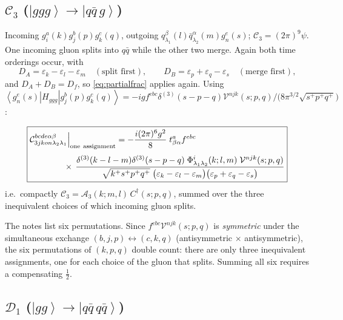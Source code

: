 \documentclass[11pt]{article}
\newcommand{\eps}{\varepsilon}
\newcommand{\dg}{\dagger}
\newcommand{\dthree}{\delta^{(3)}}
\newcommand{\ket}[1]{\left|#1\right\rangle}
\newcommand{\bra}[1]{\left\langle#1\right|}
\newcommand{\Ph}{\Phi}
\newcommand{\Vg}{\mathcal{V}}
\newcommand{\qk}[3]{q^{#1}_{#2}(#3)}
\newcommand{\aqk}[3]{\bar q^{#1}_{#2}(#3)}
\newcommand{\gl}[3]{g^{#1}_{#2}(#3)}
\begin{document}
\subsection{$\mathcal C_3$ ($\ket{ggg}\to\ket{q\bar q\,g}$)}

Incoming $\gl{a}{i}{k}\gl{b}{j}{p}\gl{c}{k}{q}$, outgoing
$\qk{\beta}{\lambda_1}{l}\aqk{\alpha}{\lambda_2}{m}\gl{e}{n}{s}$; $\mathcal C_{3}=(2\pi)^{9}\psi$.
One incoming gluon splits into $q\bar q$ while the other two merge. Again both time orderings
occur, with
\begin{equation}
D_{A}=\eps_{k}-\eps_{l}-\eps_{m}\quad(\text{split first}),\qquad
D_{B}=\eps_{p}+\eps_{q}-\eps_{s}\quad(\text{merge first}),
\end{equation}
and $D_{A}+D_{B}=D_{f}$, so \eqref{eq:partialfrac} applies again. Using
$\bra{\gl{e}{n}{s}}H_{ggg}\ket{\gl{b}{j}{p}\gl{c}{k}{q}}
=-igf^{ebc}\dthree(s-p-q)\Vg^{njk}(s;p,q)/\big(8\pi^{3/2}\sqrt{s^{+}p^{+}q^{+}}\big)$:

\begin{res}
\begin{align}
\boxed{
\begin{aligned}
&\mathcal C^{bcde\alpha\beta}_{3jkon\lambda_2\lambda_1}\Big|_{\rm one\ assignment}
=-\frac{i(2\pi)^{6}g^{2}}{8}\;t^{a}_{\beta\alpha}f^{ebc}
\\[3pt]
&\hspace{1.4cm}\times\,
\frac{\dthree(k-l-m)\dthree(s-p-q)\;\Ph^{i}_{\lambda_1\lambda_2}(k;l,m)\;\Vg^{njk}(s;p,q)}
{\sqrt{k^{+}s^{+}p^{+}q^{+}}\;\big(\eps_{k}-\eps_{l}-\eps_{m}\big)\big(\eps_{p}+\eps_{q}-\eps_{s}\big)}
\end{aligned}}
\label{eq:C3}
\end{align}
i.e.\ compactly $\mathcal C_{3}=\mathcal A_{3}(k;m,l)\,C^{\dg}(s;p,q)$, summed over the three
inequivalent choices of which incoming gluon splits.
\end{res}

\begin{note}
The notes list six permutations. Since $f^{ebc}\Vg^{njk}(s;p,q)$ is \emph{symmetric} under the
simultaneous exchange $(b,j,p)\leftrightarrow(c,k,q)$ (antisymmetric $\times$ antisymmetric),
the six permutations of $(k,p,q)$ double count: there are only three inequivalent assignments,
one for each choice of the gluon that splits. Summing all six requires a compensating $\tfrac12$.
\end{note}

\subsection{$\mathcal D_1$ ($\ket{gg}\to\ket{q\bar q\,q\bar q}$)}
\end{document}
